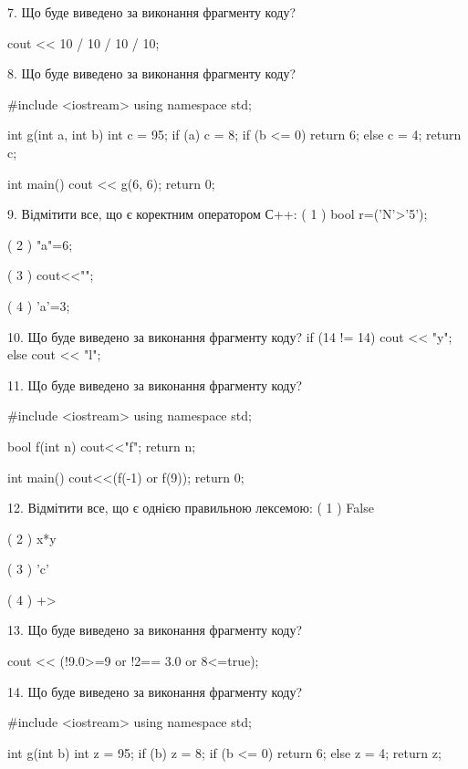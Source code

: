 \documentclass[11pt, ukrainian]{article}
\begin{document}
\begin{large}

7. Що буде виведено за виконання фрагменту коду?

cout << 10 / 10 / 10 / 10;


8. Що буде виведено за виконання фрагменту коду?

#include <iostream>
using namespace std;

int g(int a, int b){
    int c = 95;
    if (a)
        c = 8;
    if (b <= 0)
         return 6;
    else 
        c = 4;
    return c;
}

int main(){
    cout << g(6, 6);
    return 0;
}


9. Відмітити все, що є коректним оператором С++:
( 1 ) bool r=('N'>'5');

( 2 ) "a"=6;

( 3 ) cout<<"\n";

( 4 ) 'a'=3;


10. Що буде виведено за виконання фрагменту коду?
if (14 != 14)
    cout << "y";
else
    cout << "l";



11. Що буде виведено за виконання фрагменту коду?

#include <iostream>
using namespace std;

bool f(int n){
    cout<<"f";
    return n;
}

int main(){
    cout<<(f(-1) or f(9));
    return 0;
}


12. Відмітити все, що є однією правильною лексемою:
( 1 ) False

( 2 ) x*y

( 3 ) 'c'

( 4 ) +>


13. Що буде виведено за виконання фрагменту коду?

cout << (!9.0>=9 or !2== 3.0 or 8<=true);


14. Що буде виведено за виконання фрагменту коду?

#include <iostream>
using namespace std;

int g(int b){
    int z = 95;
    if (b) 
        z = 8;
    if (b <= 0)
         return 6;
    else
         z = 4;
    return z;
}


\end{large}
\end{document}
